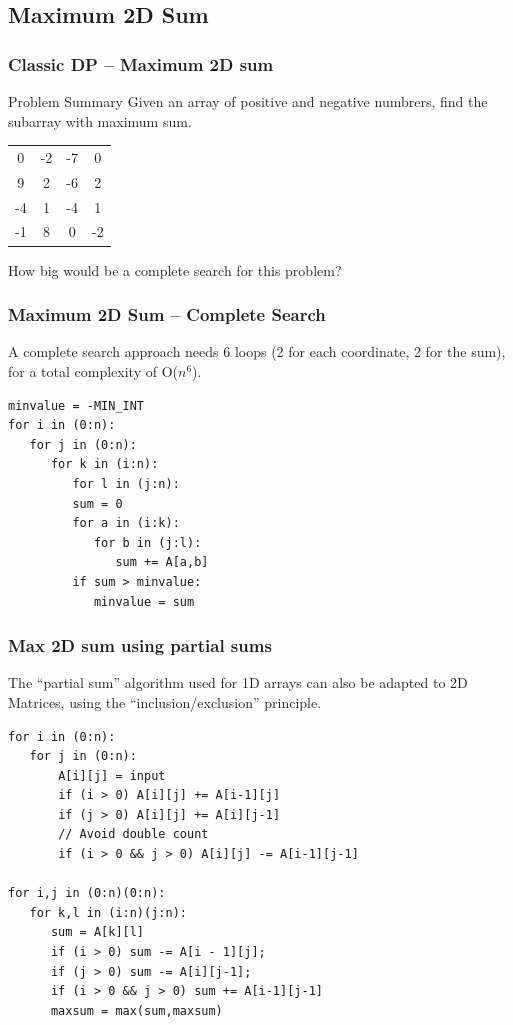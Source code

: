 \documentclass{beamer}
\begin{document}
\subsection{Maximum 2D Sum}
\begin{frame}
  \frametitle{Classic DP -- Maximum 2D sum}
  \begin{block}{Problem Summary}
    Given an array of positive and negative numbrers, find the
    subarray with maximum sum.
  \end{block}

  \bigskip

  \begin{center}
    \begin{tabular}{|cccc|}
      \hline
      0 & -2 & -7 & 0\\
      9 & 2 & -6 & 2\\
      -4 & 1 & -4 & 1\\
      -1 & 8 & 0 & -2\\
      \hline
    \end{tabular}
  \end{center}

  \bigskip

  How big would be a complete search for this problem?
\end{frame}

\begin{frame}[fragile]
  \frametitle{Maximum 2D Sum -- Complete Search}

\begin{block}{}
  A complete search approach needs 6 loops (2 for each coordinate, 2
  for the sum), for a total complexity of O($n^6$).
\end{block}

{\smaller
\begin{verbatim}
minvalue = -MIN_INT
for i in (0:n):
   for j in (0:n):
      for k in (i:n):
         for l in (j:n):
         sum = 0
         for a in (i:k):
            for b in (j:l):
               sum += A[a,b]
         if sum > minvalue:
            minvalue = sum
\end{verbatim}
}
\end{frame}

\begin{frame}[fragile]
  \frametitle{Max 2D sum using partial sums}
  \begin{block}{}
    The ``partial sum'' algorithm used for 1D arrays can also be
    adapted to 2D Matrices, using the ``inclusion/exclusion''
    principle.
  \end{block}

{\smaller
\begin{verbatim}
for i in (0:n):
   for j in (0:n):
       A[i][j] = input
       if (i > 0) A[i][j] += A[i-1][j]
       if (j > 0) A[i][j] += A[i][j-1]
       // Avoid double count
       if (i > 0 && j > 0) A[i][j] -= A[i-1][j-1]  

for i,j in (0:n)(0:n):
   for k,l in (i:n)(j:n):
      sum = A[k][l]
      if (i > 0) sum -= A[i - 1][j];
      if (j > 0) sum -= A[i][j-1];
      if (i > 0 && j > 0) sum += A[i-1][j-1]
      maxsum = max(sum,maxsum)   
\end{verbatim}
}

\end{frame}
\end{document}
